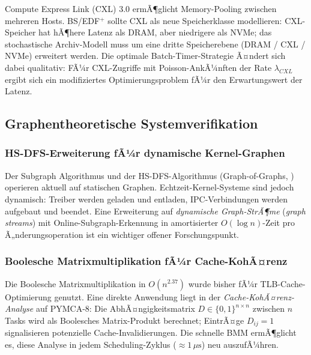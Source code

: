 ﻿\documentclass[a4paper,12pt]{scrreprt}
\theoremstyle{definition}
\begin{document}
	Compute Express Link (CXL) 3.0 ermÃ¶glicht Memory-Pooling zwischen
	mehreren Hosts. BS/EDF$^+$ sollte CXL als neue Speicherklasse
	modellieren: CXL-Speicher hat hÃ¶here Latenz als DRAM, aber niedrigere
	als NVMe; das stochastische Archiv-Modell \cite{Epp2026archv} muss
	um eine dritte Speicherebene (DRAM / CXL / NVMe) erweitert werden.
	Die optimale Batch-Timer-Strategie Ã¤ndert sich dabei qualitativ:
	FÃ¼r CXL-Zugriffe mit Poisson-AnkÃ¼nften der Rate $\lambda_{CXL}$
	ergibt sich ein modifiziertes Optimierungsproblem fÃ¼r den
	Erwartungswert der Latenz.
	
	\subsection{Graphentheoretische Systemverifikation}
	
	\subsubsection{HS-DFS-Erweiterung fÃ¼r dynamische Kernel-Graphen}
	
	Der Subgraph Algorithmus \cite{Epp2026subgraph} und der
	HS-DFS-Algorithmus (Graph-of-Graphs, \cite{Epp2026msubgraph}) operieren
	aktuell auf statischen Graphen. Echtzeit-Kernel-Systeme sind jedoch
	dynamisch: Treiber werden geladen und entladen, IPC-Verbindungen
	werden aufgebaut und beendet. Eine Erweiterung auf \emph{dynamische
		Graph-StrÃ¶me} (\emph{graph streams}) mit Online-Subgraph-Erkennung
	in amortisierter $O(\log n)$-Zeit pro Ã„nderungsoperation ist ein
	wichtiger offener Forschungspunkt.
	
	\subsubsection{Boolesche Matrixmultiplikation fÃ¼r Cache-KohÃ¤renz}
	
	Die Boolesche Matrixmultiplikation in $O(n^{2.37})$
	\cite{Epp2026boolmm} wurde bisher fÃ¼r TLB-Cache-Opti\-mierung
	genutzt. Eine direkte Anwendung liegt in der \emph{Cache-KohÃ¤renz-Analyse}
	auf PYMCA-8: Die AbhÃ¤ngigkeitsmatrix $D \in \{0,1\}^{n \times n}$
	zwischen $n$ Tasks wird als Boolesches Matrix-Produkt berechnet;
	EintrÃ¤ge $D_{ij} = 1$ signalisieren potenzielle Cache-Invalidierungen.
	Die schnelle BMM ermÃ¶glicht es, diese Analyse in jedem
	Scheduling-Zyklus ($\approx 1\,\mu\text{s}$) neu auszufÃ¼hren.
	
\end{document}
